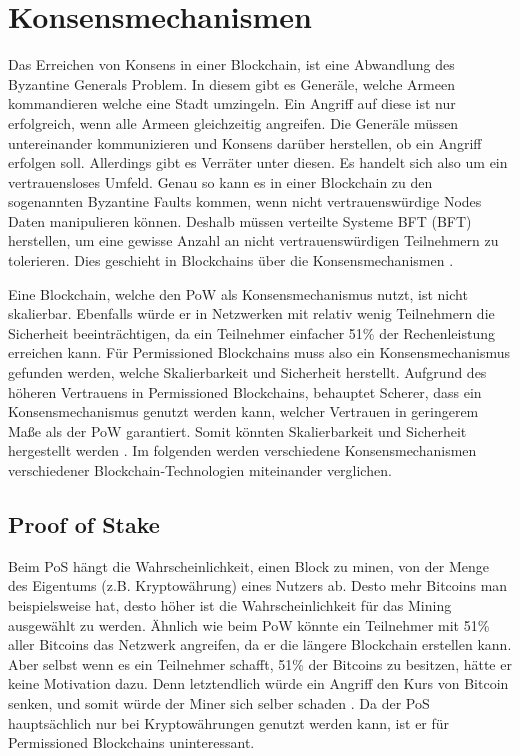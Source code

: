 \section{Konsensmechanismen}
\label{sec:eval-konsens}
Das Erreichen von Konsens in einer Blockchain, ist eine Abwandlung des Byzantine Generals Problem. In diesem gibt es Generäle, welche Armeen kommandieren welche eine Stadt umzingeln. Ein Angriff auf diese ist nur erfolgreich, wenn alle Armeen gleichzeitig angreifen. Die Generäle müssen untereinander kommunizieren und Konsens darüber herstellen, ob ein Angriff erfolgen soll. Allerdings gibt es Verräter unter diesen. Es handelt sich also um ein vertrauensloses Umfeld. Genau so kann es in einer Blockchain zu den sogenannten Byzantine Faults kommen, wenn nicht vertrauenswürdige Nodes Daten manipulieren können. Deshalb müssen verteilte Systeme \acl{BFT} (\acs{BFT}) herstellen, um eine gewisse Anzahl an nicht vertrauenswürdigen Teilnehmern zu tolerieren. Dies geschieht in Blockchains über die Konsensmechanismen \cite{ZhengBlockchainChallengesOpportunities2017}.

Eine Blockchain, welche den \acs{PoW} als Konsensmechanismus nutzt, ist nicht skalierbar. Ebenfalls würde er in Netzwerken mit relativ wenig Teilnehmern die Sicherheit beeinträchtigen, da ein Teilnehmer einfacher 51\% der Rechenleistung erreichen kann. Für Permissioned Blockchains muss also ein Konsensmechanismus gefunden werden, welche Skalierbarkeit und Sicherheit herstellt. Aufgrund des höheren Vertrauens in Permissioned Blockchains, behauptet Scherer, dass ein Konsensmechanismus genutzt werden kann, welcher Vertrauen in geringerem Maße als der \acs{PoW} garantiert. Somit könnten Skalierbarkeit und Sicherheit hergestellt werden \cite{SchererPerformanceScalabilityBlockchain2017}. Im folgenden werden verschiedene Konsensmechanismen verschiedener Blockchain-Technologien miteinander verglichen.

\subsection{Proof of Stake}
Beim PoS hängt die Wahrscheinlichkeit, einen Block zu minen, von der Menge des Eigentums (z.B. Kryptowährung) eines Nutzers ab. Desto mehr Bitcoins man beispielsweise hat, desto höher ist die Wahrscheinlichkeit für das Mining ausgewählt zu werden. Ähnlich wie beim \acs{PoW} könnte ein Teilnehmer mit 51\% aller Bitcoins das Netzwerk angreifen, da er die längere Blockchain erstellen kann. Aber selbst wenn es ein Teilnehmer schafft, 51\% der Bitcoins zu besitzen, hätte er keine Motivation dazu. Denn letztendlich würde ein Angriff den Kurs von Bitcoin senken, und somit würde der Miner sich selber schaden \cite{ZhengBlockchainChallengesOpportunities2017}. Da der PoS hauptsächlich nur bei Kryptowährungen genutzt werden kann, ist er für Permissioned Blockchains uninteressant.


